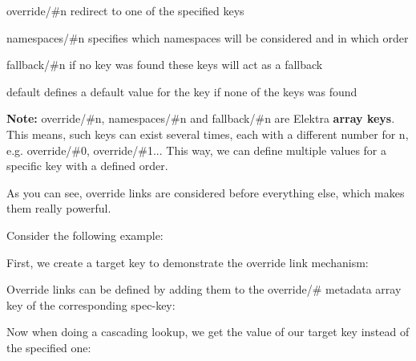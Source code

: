 \begin{DoxyEnumerate}
\item {\ttfamily override/\#n} redirect to one of the specified keys
\item {\ttfamily namespaces/\#n} specifies which namespaces will be considered and in which order
\item {\ttfamily fallback/\#n} if no key was found these keys will act as a fallback
\item {\ttfamily default} defines a default value for the key if none of the keys was found
\end{DoxyEnumerate}

{\bfseries{Note\+:}} {\ttfamily override/\#n}, {\ttfamily namespaces/\#n} and {\ttfamily fallback/\#n} are Elektra {\bfseries{array keys}}. This means, such keys can exist several times, each with a different number for {\ttfamily n}, e.\+g. {\ttfamily override/\#0}, {\ttfamily override/\#1}... This way, we can define multiple values for a specific key with a defined order.

As you can see, override links are considered before everything else, which makes them really powerful.

Consider the following example\+:

First, we create a target key to demonstrate the override link mechanism\+:


\begin{DoxyCode}{0}
\end{DoxyCode}


Override links can be defined by adding them to the {\ttfamily override/\#} metadata array key of the corresponding {\ttfamily spec-\/key}\+:


\begin{DoxyCode}{0}
\end{DoxyCode}


Now when doing a cascading lookup, we get the value of our target key instead of the specified one\+:


\begin{DoxyCode}{0}
\end{DoxyCode}


